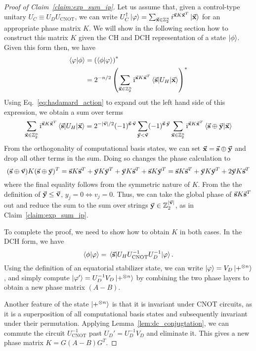 \begin{proof}[Proof of Claim~\ref{claim:exp_sum_ip}]
Let us assume that, given a control-type unitary $U_{C}\equiv U_{D}U_{\text{CNOT}}$, we can write $U_{C}^{\dagger}\ket{\varphi}=\sum_{\va{x}\in\mathbb{Z}_{2}^{n}}i^{\va{x}K\va{x}^{T}}\ket{\va{x}}$ for an appropriate phase matrix $K$. We will show in the following section how to construct this matrix $K$ given the CH and DCH representation of a state $\ket{\phi}$. Given this form then, we have
\begin{align*}
\braket{\varphi}{\phi} &= \left(\braket{\phi}{\varphi}\right)^{*} \\ 
&= 2^{-n/2}\left(\sum_{\va{x}\in\mathbb{Z}_{2}^{n}}\mathi^{\va{x}K\va{x}^{T}} \matrixel{\va{s}}{U_{H}}{\va{x}} \right)^{*}\\
\end{align*}
Using Eq.~\ref{eq:hadamard_action} to expand out the left hand side of this expression, we obtain a sum over terms
\[\sum_{\va{x}\in\mathbb{Z}_{2}^{n}}\mathi^{\va{x}K\va{x}^{T}} \matrixel{\va{s}}{U_{H}}{\va{x}} = 2^{-\vert \va{v}\vert/2}(-1)^{\va{s}\cdot \va{v}}\sum_{\va{y}<\va{v}}(-1)^{\va{s}\cdot \va{y}}\sum_{\va{x}\in\mathbb{Z}_{2}^{n}}\mathi^{\va{x}K\va{x}^{T}}\braket{\va{s}\oplus \va{y}}{\va{x}}\]
From the orthogonality of computational basis states, we can set $\va{x}=\va{s}\oplus \va{y}$ and drop all other terms in the sum. Doing so changes the phase calculation to
\[(\va{s}\oplus \va{v})K(\va{s}\oplus \va{y})^{T}=\va{s}K\va{s}^{T}+\va{y}K\va{y}^{T}+\va{y}K\va{s}^{T}+\va{s}K\va{y}^{T} = \va{s}K\va{s}^{T}+\va{y}K\va{y}^{T}+2\va{y}K\va{s}^{T} \]
where the final equality follows from the symmetric nature of $K$. From the the definition of $\va{y}\leq \va{v}$, $y_{j}=0\iff v_{j}=0$. Thus, we can take the global phase of $\va{s}K\va{s}^{T}$ out and reduce the sum to the sum over strings $\va{y}\in\mathbb{Z}_{2}^{\vert \va{v}\vert}$, as in Claim~\ref{claim:exp_sum_ip}.\par
To complete the proof, we need to show how to obtain $K$ in both cases. In the DCH form, we have
\[\braket{\phi}{\varphi}=\matrixel{\va{s}}{U_{H}U_{\text{CNOT}}^{-1}U_{D}^{-1}}{\varphi}.\]
Using the definition of an equatorial stabilizer state, we can write $\ket{\varphi}=V_{D}\ket{+^{\otimes n}}$, and simply compute $\ket{\varphi'}=U_{D}^{-1}V_{D}\ket{+^{\otimes n}}$ by combining the two phase layers to obtain a new phase matrix $(A-B)$.\par
Another feature of the state $\ket{+^{\otimes n}}$ is that it is invariant under CNOT circuits, as it is a superposition of all computational basis states and subsequently invariant under their permutation. Applying Lemma~\ref{lem:dc_conjugtation}, we can commute the circuit $U_{\text{CNOT}}^{-1}$ past $U_{D}'=U_{D}^{-1}V_{D}$ and eliminate it. This gives a new phase matrix $K=G(A-B)G^{T}$.\par

\end{proof}
